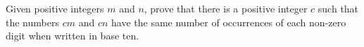 Given positive integers $m$ and $n$,  prove that there is a positive integer $c$ such that the numbers $cm$ and $cn$ have the same number of occurrences of each non-zero digit when written in base ten.